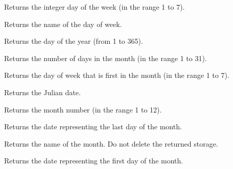 
Returns the integer day of the week (in the range 1 to 7).

\label{wxdategetdayofweekname}


Returns the name of the day of week.

\label{wxdategetdayofyear}


Returns the day of the year (from 1 to 365).

\label{wxdategetdaysinmonth}


Returns the number of days in the month (in the range 1 to 31).

\label{wxdategetfirstdayofmonth}


Returns the day of week that is first in the month (in the range 1 to 7).

\label{wxdategetjuliandate}


Returns the Julian date.

\label{wxdategetmonth}


Returns the month number (in the range 1 to 12).



Returns the date representing the last day of the month.

\label{wxdategetmonthname}


Returns the name of the month. Do not delete the returned storage.

\label{wxdategetmonthstart}


Returns the date representing the first day of the month.

